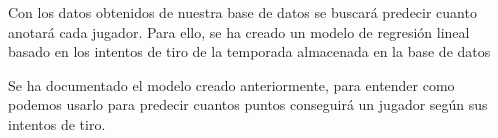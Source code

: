 \documentclass[idxtotoc,hyperref,openany]{labbook} %
\begin{document}
Con los datos obtenidos de nuestra base de datos se buscará predecir cuanto anotará cada jugador. Para ello, se ha creado un modelo de regresión lineal basado en los intentos de tiro de la temporada almacenada en la base de datos

Se ha documentado el modelo creado anteriormente, para entender como podemos usarlo para predecir cuantos puntos conseguirá un jugador según sus intentos de tiro.

%
%
%
%
%
%
%
%
%
%
%
%
%
%
\end{document}
